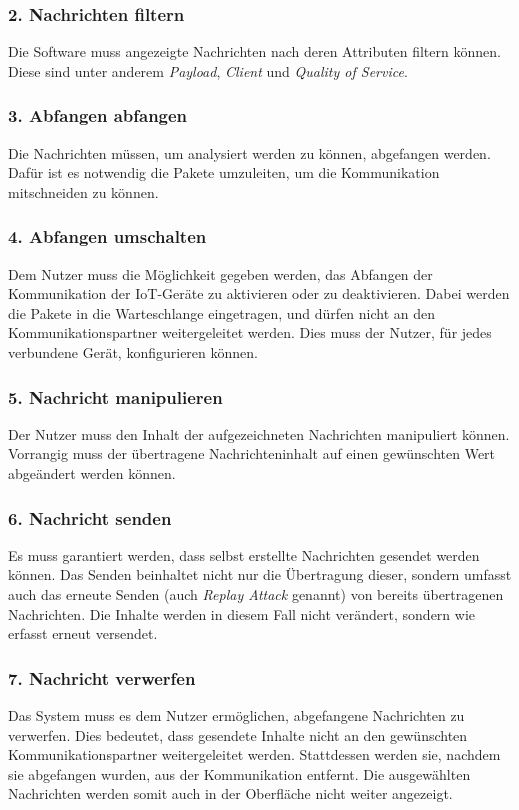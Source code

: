         \subsubsection{2. Nachrichten filtern}
        Die Software muss angezeigte Nachrichten nach deren Attributen filtern können. Diese sind unter anderem \emph{Payload}, \emph{Client} und \emph{Quality of Service}.
        
        \subsubsection{3. Abfangen abfangen}
        Die Nachrichten müssen, um analysiert werden zu können, abgefangen werden. Dafür ist es notwendig die Pakete umzuleiten, um die Kommunikation mitschneiden zu können.
        
        \subsubsection{4. Abfangen umschalten}
        Dem Nutzer muss die Möglichkeit gegeben werden, das Abfangen der Kommunikation der \ac{IoT}-Geräte zu aktivieren oder zu deaktivieren.
        Dabei werden die Pakete in die Warteschlange eingetragen, und dürfen nicht an den Kommunikationspartner weitergeleitet werden.
        Dies muss der Nutzer, für jedes verbundene Gerät, konfigurieren können.
        
        \subsubsection{5. Nachricht manipulieren}
        Der Nutzer muss den Inhalt der aufgezeichneten Nachrichten manipuliert können. Vorrangig muss der übertragene Nachrichteninhalt auf einen gewünschten Wert abgeändert werden können.
        
        \subsubsection{6. Nachricht senden}
        Es muss garantiert werden, dass selbst erstellte Nachrichten gesendet werden können.
        Das Senden beinhaltet nicht nur die Übertragung dieser, sondern umfasst auch das erneute Senden (auch \emph{Replay Attack} genannt) von bereits übertragenen Nachrichten. Die Inhalte werden in diesem Fall nicht verändert, sondern wie erfasst erneut versendet.
        
        \subsubsection{7. Nachricht verwerfen}
        Das System muss es dem Nutzer ermöglichen, abgefangene Nachrichten zu verwerfen.
        Dies bedeutet, dass gesendete Inhalte nicht an den gewünschten Kommunikationspartner weitergeleitet werden. Stattdessen werden sie, nachdem sie abgefangen wurden, aus der Kommunikation entfernt.
        Die ausgewählten Nachrichten werden somit auch in der Oberfläche nicht weiter angezeigt.
        
